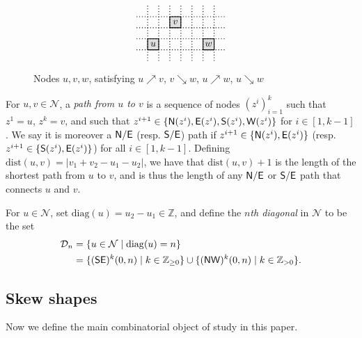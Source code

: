 \documentclass[Unicode,ALCO]{cedram}
\newcommand{\N}{\mathcal{N}}
\newcommand{\0}{{\bar 0}}
\newcommand{\diag}{{\mathrm {diag}}}
\newcommand{\dist}{{\mathrm {dist}}}
\newcommand{\ZZ}{{\mathbb Z}}
\newcommand{\D}{{\mathcal D}}
\newcommand{\so}{{\sf S}}
\newcommand{\no}{{\sf N}}
\newcommand{\ea}{{\sf E}}
\newcommand{\we}{{\sf W}}
\newcommand{\hackcenter}[1]{
 \xy (0,0)*{#1}; \endxy}
\begin{document}
\begin{figure}
\begin{align*}
{}
\hackcenter{
\begin{tikzpicture}[scale=0.4]
\draw[thick, fill = lightgray!50] (0,0)--(1,0)--(1,1)--(0,1)--(0,0);
\draw[thick, fill = lightgray!50] (2,2)--(3,2)--(3,3)--(2,3)--(2,2);
\draw[thick, fill = lightgray!50] (5,0)--(6,0)--(6,1)--(5,1)--(5,0);
\draw[thick, dotted] (-1,0)--(7,0);
\draw[thick, dotted] (-1,1)--(7,1);
\draw[thick, dotted] (-1,2)--(7,2);
\draw[thick, dotted] (-1,3)--(7,3);
\draw[thick, dotted] (0,-1)--(0,4);
\draw[thick, dotted] (1,-1)--(1,4);
\draw[thick, dotted] (2,-1)--(2,4);
\draw[thick, dotted] (3,-1)--(3,4);
\draw[thick, dotted] (4,-1)--(4,4);
\draw[thick, dotted] (5,-1)--(5,4);
\draw[thick, dotted] (6,-1)--(6,4);
\node at (0.5,0.5){$u$};
\node at (2.5,2.5){$v$};
\node at (5.5,0.5){$w$};
\end{tikzpicture}
}
\end{align*}
\caption{Nodes \(u,v,w\), satisfying \(u  \nearrow v\), \(v \searrow w\), \(u \nearrow w\), \(u \searrow w\)}
\label{fig:nodes}     
\end{figure}

For \(u,v \in \N\), a {\em path from \(u\) to \(v\)} is a sequence of nodes \((z^i)_{i=1}^k\) such that \(z^1 = u\), \(z^k = v\), and such that \(z^{i+1} \in \{\no(z^i), \ea(z^i), \so(z^i), \we(z^i)\}\) for \(i \in [1,k-1]\). We say it is moreover a \(\no/\ea\) (resp. \(\so/\ea\)) path if \(z^{i+1} \in \{\no(z^i), \ea(z^i)\}\) (resp. \(z^{i+1} \in \{\so(z^i), \ea(z^i)\}\)) for all \(i \in [1,k-1]\). Defining \(\dist(u,v) = |v_1 + v_2 - u_1 -u_2|\), we have that \(\dist(u,v)+1\) is the length of the shortest path from \(u\) to \(v\), and is thus the length of any \(\no/\ea\) or \(\so/\ea\) path that connects \(u\) and \(v\).

For \(u \in \N\), set \(\diag(u) = u_2 - u_1 \in \ZZ\), and define the {\em \(n\)th diagonal} in \(\N\) to be the set
\begin{align*}
\D_n &= \{u \in \N \mid \diag(u) = n\}\\
&= \{(\so \ea)^k(0,n) \mid k \in \ZZ_{\geq 0}\} \cup \{(\no \we)^k(0,n) \mid k \in \ZZ_{>0}\}.
\end{align*}


\subsection{Skew shapes}
Now we define the main combinatorial object of study in this paper.
\end{document}
